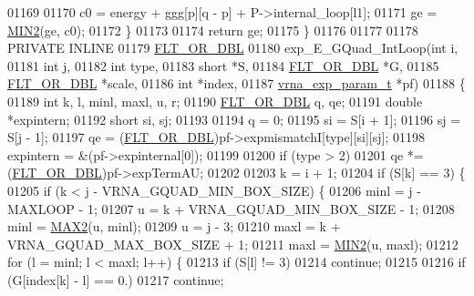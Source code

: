 \begin{DoxyCode}
01169 
01170       c0  = energy + ggg[p][q - p] + P->internal\_loop[l1];
01171       ge  = \hyperlink{group__utils_gae0b9cd0ce090bd69b951aa73e8fa4f7d}{MIN2}(ge, c0);
01172     \}
01173 
01174   \textcolor{keywordflow}{return} ge;
01175 \}
01176 
01177 
01178 PRIVATE INLINE
01179 \hyperlink{group__data__structures_ga31125aeace516926bf7f251f759b6126}{FLT\_OR\_DBL}
01180 exp\_E\_GQuad\_IntLoop(\textcolor{keywordtype}{int}               i,
01181                     \textcolor{keywordtype}{int}               j,
01182                     \textcolor{keywordtype}{int}               type,
01183                     \textcolor{keywordtype}{short}             *S,
01184                     \hyperlink{group__data__structures_ga31125aeace516926bf7f251f759b6126}{FLT\_OR\_DBL}        *G,
01185                     \hyperlink{group__data__structures_ga31125aeace516926bf7f251f759b6126}{FLT\_OR\_DBL}        *scale,
01186                     \textcolor{keywordtype}{int}               *index,
01187                     \hyperlink{group__energy__parameters_structvrna__exp__param__s}{vrna\_exp\_param\_t}  *pf)
01188 \{
01189   \textcolor{keywordtype}{int}         k, l, minl, maxl, u, r;
01190   \hyperlink{group__data__structures_ga31125aeace516926bf7f251f759b6126}{FLT\_OR\_DBL}  q, qe;
01191   \textcolor{keywordtype}{double}      *expintern;
01192   \textcolor{keywordtype}{short}       si, sj;
01193 
01194   q         = 0;
01195   si        = S[i + 1];
01196   sj        = S[j - 1];
01197   qe        = (\hyperlink{group__data__structures_ga31125aeace516926bf7f251f759b6126}{FLT\_OR\_DBL})pf->expmismatchI[type][si][sj];
01198   expintern = &(pf->expinternal[0]);
01199 
01200   \textcolor{keywordflow}{if} (type > 2)
01201     qe *= (\hyperlink{group__data__structures_ga31125aeace516926bf7f251f759b6126}{FLT\_OR\_DBL})pf->expTermAU;
01202 
01203   k = i + 1;
01204   if (S[k] == 3) \{
01205     \textcolor{keywordflow}{if} (k < j - VRNA\_GQUAD\_MIN\_BOX\_SIZE) \{
01206       minl  = j - MAXLOOP - 1;
01207       u     = k + VRNA\_GQUAD\_MIN\_BOX\_SIZE - 1;
01208       minl  = \hyperlink{group__utils_ga33297b3679c713b0c4d897cd0fe3b122}{MAX2}(u, minl);
01209       u     = j - 3;
01210       maxl  = k + VRNA\_GQUAD\_MAX\_BOX\_SIZE + 1;
01211       maxl  = \hyperlink{group__utils_gae0b9cd0ce090bd69b951aa73e8fa4f7d}{MIN2}(u, maxl);
01212       \textcolor{keywordflow}{for} (l = minl; l < maxl; l++) \{
01213         \textcolor{keywordflow}{if} (S[l] != 3)
01214           \textcolor{keywordflow}{continue};
01215 
01216         \textcolor{keywordflow}{if} (G[index[k] - l] == 0.)
01217           \textcolor{keywordflow}{continue};

\end{DoxyCode}
